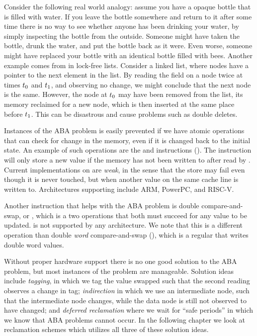 \documentclass[b5paper]{report}
\begin{document}
Consider the following real world analogy: assume you have a opaque bottle that
is filled with water. If you leave the bottle somewhere and return to it after
some time there is no way to see whether anyone has been drinking your water, by
simply inspecting the bottle from the outside. Someone might have taken the
bottle, drunk the water, and put the bottle back as it were. Even worse, someone
might have replaced your bottle with an identical bottle filled with bees.
Another example comes from in lock-free lists. Consider a linked list, where
nodes have a  pointer to the next element in the list.  By reading
the  field on a node twice at times $t\sb{0}$ and $t\sb{1}$, and
observing no change, we might conclude that the next node is the same. However,
the node at $t\sb{0}$ may have been removed from the list, its memory reclaimed
for a new node, which is then inserted at the same place before $t\sb{1}$. This
can be disastrous and cause problems such as double deletes.

Instances of the ABA problem is easily prevented if we have atomic operations
that can check for change in the memory, even if it is changed back to the
initial state. An example of such operations are the  and
 instructions (). The  instruction
will only store a new value if the memory has not been written to after read by
. Current implementations on  are \emph{weak}, in the sense
that the store may fail even though it is never touched, but when another value
on the same cache line is written to. Architectures supporting 
include ARM, PowerPC, and RISC-V.

Another instruction that helps with the ABA problem is double compare-and-swap,
or , which is a two  operations that both must succeed for
any value to be updated.  is not supported by any architecture. We
note that this is a different operation than double \emph{word} compare-and-swap
(), which is a regular  that writes double word values.

Without proper hardware support there is no one good solution to the ABA
problem, but most instances of the problem are manageable. Solution ideas include
\emph{tagging}, in which we tag the value swapped such that the second reading
observes a change in tag; \emph{indirection} in which we use an intermediate
node, such that the intermediate node changes, while the data node is still not
observed to have changed; and \emph{deferred reclamation} where we wait for
``safe periods'' in which we know that ABA problems cannot occur. In the
following chapter we look at reclamation schemes which utilizes all three of
these solution ideas.
\end{document}
